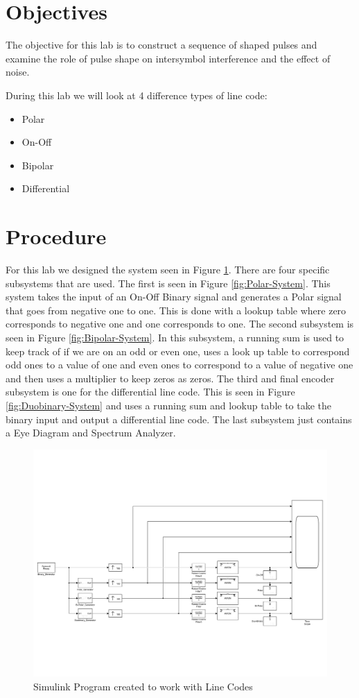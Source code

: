 \documentclass{article}
\begin{document}
\section{Objectives}
\indent
The objective for this lab is to construct a sequence of shaped pulses and examine the role of pulse shape on intersymbol interference and the effect of noise.

\noindent
During this lab we will look at 4 difference types of line code:
  \begin{itemize}
    \item Polar
    \item On-Off
    \item Bipolar
    \item Differential
  \end{itemize}

\section{Procedure}
\indent
For this lab we designed the system seen in Figure \ref{fig:Full-System}.
There are four specific subsystems that are used. The first is seen in Figure \ref{fig:Polar-System}. This system takes the input of an On-Off Binary signal and generates a Polar signal that goes from negative one to one. This is done with a lookup table where zero corresponds to negative one and one corresponds to one. The second subsystem is seen in Figure \ref{fig:Bipolar-System}. In this subsystem, a running sum is used to keep track of if we are on an odd or even one, uses a look up table to correspond odd ones to a value of one and even ones to correspond to a value of negative one and then uses a multiplier to keep zeros as zeros. The third and final encoder subsystem is one for the differential line code. This is seen in Figure \ref{fig:Duobinary-System} and uses a running sum and lookup table to take the binary input and output a differential line code. The last subsystem just contains a Eye Diagram and Spectrum Analyzer.
\begin{figure}[H]
  \includegraphics[width = \linewidth]{Full_System.png}
  \caption{Simulink Program created to work with Line Codes}
  \label{fig:Full-System}
\end{figure}
\end{document}
